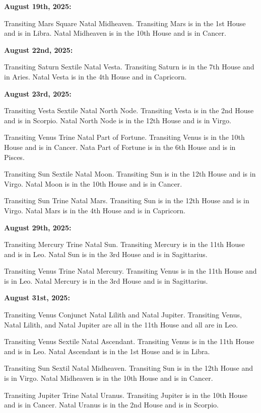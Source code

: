 \documentclass{article}
\begin{document}
\textbf{August 19th, 2025:}

Transiting Mars Square Natal Midheaven. Transiting Mars is in the 1st House and is in Libra. Natal Midheaven is in the 10th House and is in Cancer.

\textbf{August 22nd, 2025:}

Transiting Saturn Sextile Natal Vesta. Transiting Saturn is in the 7th House and in Aries. Natal Vesta is in the 4th House and in Capricorn.

\textbf{August 23rd, 2025:}

Transiting Vesta Sextile Natal North Node. Transiting Vesta is in the 2nd House and is in Scorpio. Natal North Node is in the 12th House and is in Virgo.

Transiting Venus Trine Natal Part of Fortune. Transiting Venus is in the 10th House and is in Cancer. Nata Part of Fortune is in the 6th House and is in Pisces.

Transiting Sun Sextile Natal Moon. Transiting Sun is in the 12th House and is in Virgo. Natal Moon is in the 10th House and is in Cancer.

Transiting Sun Trine Natal Mars. Transiting Sun is in the 12th House and is in Virgo. Natal Mars is in the 4th House and is in Capricorn.

\textbf{August 29th, 2025:}

Transiting Mercury Trine Natal Sun. Transiting Mercury is in the 11th House and is in Leo. Natal Sun is in the 3rd House and is in Sagittarius.

Transiting Venus Trine Natal Mercury. Transiting Venus is in the 11th House and is in Leo. Natal Mercury is in the 3rd House and is in Sagittarius.

\textbf{August 31st, 2025:}

Transiting Venus Conjunct Natal Lilith and Natal Jupiter. Transiting Venus, Natal Lilith, and Natal Jupiter are all in the 11th House and all are in Leo.

Transiting Venus Sextile Natal Ascendant. Transiting Venus is in the 11th House and is in Leo. Natal Ascendant is in the 1st House and is in Libra.

Transiting Sun Sextil Natal Midheaven. Transiting Sun is in the 12th House and is in Virgo. Natal Midheaven is in the 10th House and is in Cancer.

Transiting Jupiter Trine Natal Uranus. Transiting Jupiter is in the 10th House and is in Cancer. Natal Uranus is in the 2nd House and is in Scorpio.
\end{document}
